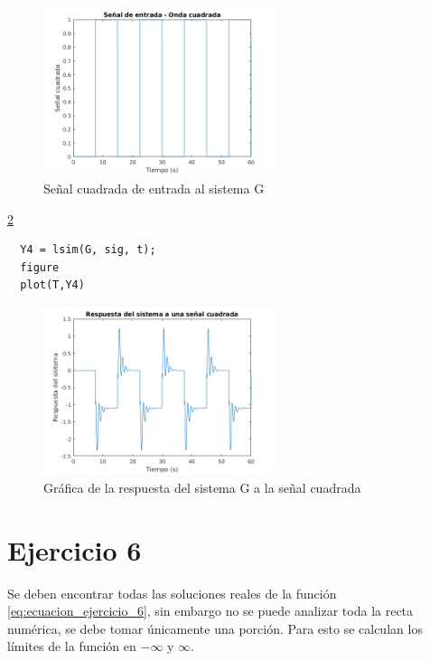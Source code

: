\documentclass[12pt,letterpaper]{article}
\begin{document}
\begin{figure}[ht!]
	\centering
	\includegraphics[width=0.6\textwidth]{pictures/Ejercicio5/onda_cuadrada}
	\caption{Señal cuadrada de entrada al sistema G}
	\label{fig:onda_cuadrada}
\end{figure} 



\ref{fig:respuesta_onda_cuadrada}

\begin{lstlisting}[style=Matlab-editor, basicstyle=\mlttfamily]
  % Respuesta a la onda cuadrada
  Y4 = lsim(G, sig, t);
  figure
  plot(T,Y4)
\end{lstlisting}

\begin{figure}[ht!]
	\centering
	\includegraphics[width=0.6\textwidth]{pictures/Ejercicio5/respuesta_onda_cuadrada}
	\caption{Gráfica de la respuesta del sistema G a la señal cuadrada}
	\label{fig:respuesta_onda_cuadrada}
\end{figure} 





\section{Ejercicio 6}

Se deben encontrar todas las soluciones reales de la función \ref{eq:ecuacion_ejercicio_6}, sin embargo no se puede analizar toda la recta numérica, se debe tomar únicamente una porción. Para esto se calculan los límites de la función en $-\infty$ y $\infty$. 
\end{document}
